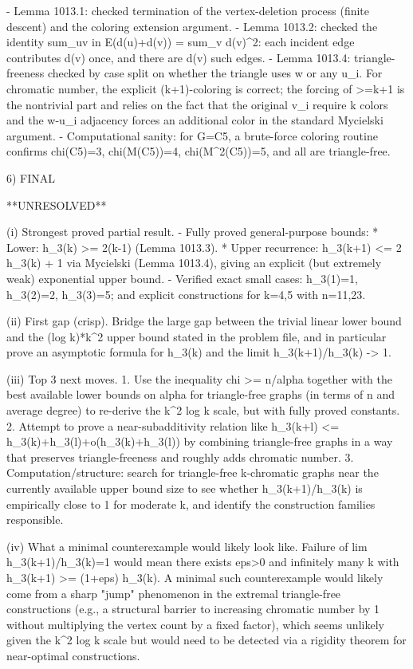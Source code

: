 - Lemma 1013.1: checked termination of the vertex-deletion process (finite descent) and the coloring extension argument.
- Lemma 1013.2: checked the identity sum_{uv in E}(d(u)+d(v)) = sum_v d(v)^2: each incident edge contributes d(v) once, and there are d(v) such edges.
- Lemma 1013.4: triangle-freeness checked by case split on whether the triangle uses w or any u_i.
  For chromatic number, the explicit (k+1)-coloring is correct; the forcing of >=k+1 is the nontrivial part and relies on the fact that the original v_i require k colors and the w-u_i adjacency forces an additional color in the standard Mycielski argument.
- Computational sanity: for G=C5, a brute-force coloring routine confirms chi(C5)=3, chi(M(C5))=4, chi(M^2(C5))=5, and all are triangle-free.

6) FINAL

**UNRESOLVED**

(i) Strongest proved partial result.
- Fully proved general-purpose bounds:
  * Lower: h_3(k) >= 2(k-1) (Lemma 1013.3).
  * Upper recurrence: h_3(k+1) <= 2 h_3(k) + 1 via Mycielski (Lemma 1013.4), giving an explicit (but extremely weak) exponential upper bound.
- Verified exact small cases: h_3(1)=1, h_3(2)=2, h_3(3)=5; and explicit constructions for k=4,5 with n=11,23.

(ii) First gap (crisp).
Bridge the large gap between the trivial linear lower bound and the (log k)*k^2 upper bound stated in the problem file, and in particular prove an asymptotic formula for h_3(k) and the limit h_3(k+1)/h_3(k) -> 1.

(iii) Top 3 next moves.
1. Use the inequality chi >= n/alpha together with the best available lower bounds on alpha for triangle-free graphs (in terms of n and average degree) to re-derive the k^2 log k scale, but with fully proved constants.
2. Attempt to prove a near-subadditivity relation like h_3(k+l) <= h_3(k)+h_3(l)+o(h_3(k)+h_3(l)) by combining triangle-free graphs in a way that preserves triangle-freeness and roughly adds chromatic number.
3. Computation/structure: search for triangle-free k-chromatic graphs near the currently available upper bound size to see whether h_3(k+1)/h_3(k) is empirically close to 1 for moderate k, and identify the construction families responsible.

(iv) What a minimal counterexample would likely look like.
Failure of lim h_3(k+1)/h_3(k)=1 would mean there exists eps>0 and infinitely many k with h_3(k+1) >= (1+eps) h_3(k). A minimal such counterexample would likely come from a sharp "jump" phenomenon in the extremal triangle-free constructions (e.g., a structural barrier to increasing chromatic number by 1 without multiplying the vertex count by a fixed factor), which seems unlikely given the k^2 log k scale but would need to be detected via a rigidity theorem for near-optimal constructions.


